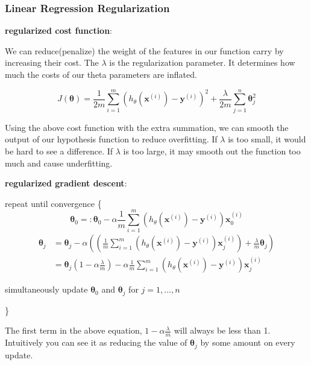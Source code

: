 \documentclass{article}
\begin{document}
\subsubsection{Linear Regression Regularization}

\noindent \textbf{regularized cost function}:

\noindent We can reduce(penalize) the weight of the features in our function carry by increasing their cost. The \(\lambda\) is the regularization parameter. It determines how much the costs of our theta parameters are inflated. 

\[J(\boldsymbol{\theta}) = \frac{1}{2m} \sum_{i = 1}^m (h_{\theta}(\textbf{x}^{(i)}) - \textbf{y}^{(i)})^2 + \frac{\lambda}{2m} \sum_{j = 1}^n \boldsymbol{\theta}_j^2\]

\noindent Using the above cost function with the extra summation, we can smooth the output of our hypothesis function to reduce overfitting. If \(\lambda\) is too small, it would be hard to see a difference. If \(\lambda\) is too large, it may smooth out the function too much and cause underfitting.

\bigskip

\noindent \textbf{regularized gradient descent}:

\noindent repeat until convergence \{
\[\boldsymbol{\theta}_0 =: \boldsymbol{\theta}_0 - \alpha \frac{1}{m} \sum_{i = 1}^m (h_{\theta}(\textbf{x}^{(i)}) - \textbf{y}^{(i)}) \textbf{x}^{(i)}_0\]
\begin{equation*}
\begin{split}
\boldsymbol{\theta}_j & = \boldsymbol{\theta}_j - \alpha ((\frac{1}{m} \sum_{i = 1}^m (h_{\theta}(\textbf{x}^{(i)}) - \textbf{y}^{(i)}) \textbf{x}^{(i)}_j) + \frac{\lambda}{m} \boldsymbol{\theta}_j) \\
 & = \boldsymbol{\theta}_j (1 - \alpha \frac{\lambda}{m}) - \alpha \frac{1}{m} \sum_{i = 1}^m (h_{\theta}(\textbf{x}^{(i)}) - \textbf{y}^{(i)}) \textbf{x}^{(i)}_j
\end{split}
\end{equation*}

\centerline{simultaneously update \(\boldsymbol{\theta}_0\) and \(\boldsymbol{\theta}_j\) for \(j = 1, \dots, n\)}
\}

\bigskip

\noindent The first term in the above equation, \(1 - \alpha \frac{\lambda}{m}\) will always be less than 1. Intuitively you can see it as reducing the value of \(\boldsymbol{\theta}_j\) by some amount on every update.
\end{document}
